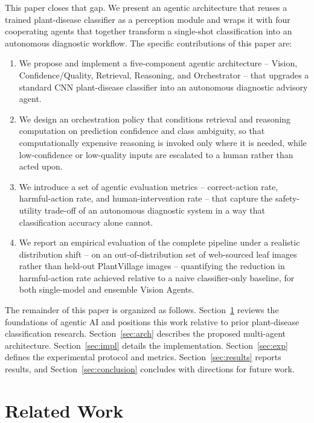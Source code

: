 \documentclass[conference]{IEEEtran}
\begin{document}
This paper closes that gap. We present an agentic architecture that reuses a trained plant-disease classifier as a perception module and wraps it with four cooperating agents that together transform a single-shot classification into an autonomous diagnostic workflow. The specific contributions of this paper are:

\begin{enumerate}
\item We propose and implement a five-component agentic architecture -- Vision, Confidence/Quality, Retrieval, Reasoning, and Orchestrator -- that upgrades a standard CNN plant-disease classifier into an autonomous diagnostic advisory agent.
\item We design an orchestration policy that conditions retrieval and reasoning computation on prediction confidence and class ambiguity, so that computationally expensive reasoning is invoked only where it is needed, while low-confidence or low-quality inputs are escalated to a human rather than acted upon.
\item We introduce a set of agentic evaluation metrics -- correct-action rate, harmful-action rate, and human-intervention rate -- that capture the safety-utility trade-off of an autonomous diagnostic system in a way that classification accuracy alone cannot.
\item We report an empirical evaluation of the complete pipeline under a realistic distribution shift -- on an out-of-distribution set of web-sourced leaf images rather than held-out {PlantVillage} images -- quantifying the reduction in harmful-action rate achieved relative to a naive classifier-only baseline, for both single-model and ensemble Vision Agents.
\end{enumerate}

The remainder of this paper is organized as follows. Section~\ref{sec:related} reviews the foundations of agentic AI and positions this work relative to prior plant-disease classification research. Section~\ref{sec:arch} describes the proposed multi-agent architecture. Section~\ref{sec:impl} details the implementation. Section~\ref{sec:exp} defines the experimental protocol and metrics. Section~\ref{sec:results} reports results, and Section~\ref{sec:conclusion} concludes with directions for future work.

\section{Related Work}
\label{sec:related}
\end{document}
